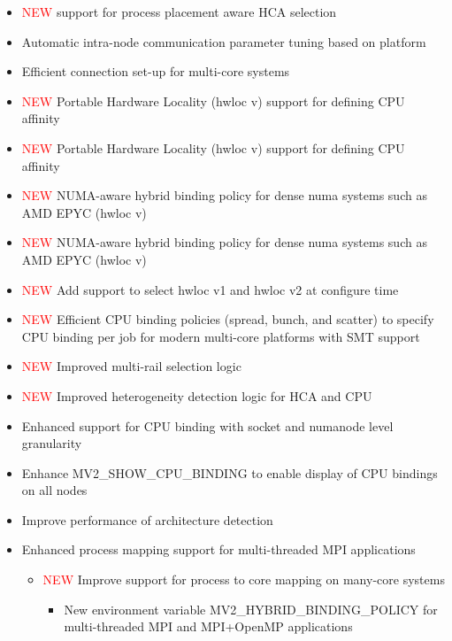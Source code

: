 \begin{itemize}
\begin{itemize}
      \item \textcolor{red}{NEW} support for process placement aware HCA
          selection
      \item  Automatic intra-node communication parameter tuning based on platform
      \item  Efficient connection set-up for multi-core systems
      \item  \textcolor{red}{NEW}  Portable Hardware Locality (hwloc v\hwlocvOneVersion)
           support for defining CPU affinity 
      \item  \textcolor{red}{NEW}  Portable Hardware Locality (hwloc v\hwlocvTwoVersion)
           support for defining CPU affinity 
      \item  \textcolor{red}{NEW}  NUMA-aware hybrid binding policy for dense
numa systems such as AMD EPYC (hwloc v\hwlocvOneVersion)
      \item  \textcolor{red}{NEW} NUMA-aware hybrid binding policy for dense
numa systems such as AMD EPYC (hwloc v\hwlocvTwoVersion)
      \item   \textcolor{red}{NEW} Add support to select hwloc v1 and hwloc v2
          at configure time
      \item  \textcolor{red}{NEW} Efficient CPU binding policies
           (spread, bunch, and scatter) to specify CPU binding per job for 
           modern multi-core platforms with SMT support
      \item  \textcolor{red}{NEW} Improved multi-rail selection logic
      \item  \textcolor{red}{NEW} Improved heterogeneity detection logic for HCA
and CPU
      \item  Enhanced support for CPU binding with socket and numanode level granularity
      \item  Enhance MV2\_SHOW\_CPU\_BINDING to enable display of CPU bindings on all nodes
      \item Improve performance of architecture detection
      \item Enhanced process mapping support for multi-threaded MPI applications
          \begin{itemize}
              \item \textcolor{red}{NEW} Improve support for process to core
                  mapping on many-core systems
              \begin{itemize}
              \item New environment variable MV2\_HYBRID\_BINDING\_POLICY for
                  multi-threaded MPI and MPI+OpenMP applications

\end{itemize}
\end{itemize}
\end{itemize}
\end{itemize}
